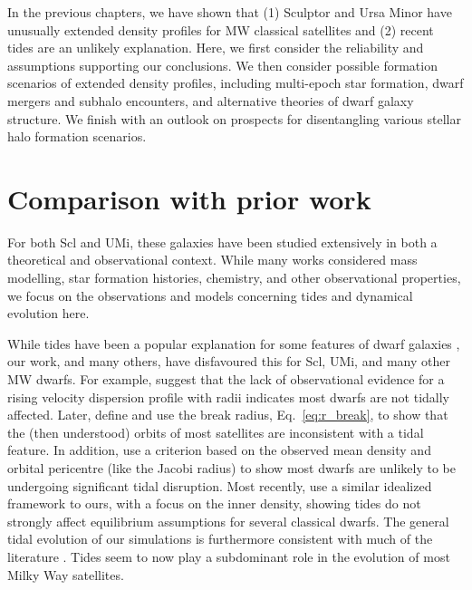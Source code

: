 In the previous chapters, we have shown that (1) Sculptor and Ursa Minor
have unusually extended density profiles for MW classical satellites and
(2) recent tides are an unlikely explanation. Here, we first consider
the reliability and assumptions supporting our conclusions. We then
consider possible formation scenarios of extended density profiles,
including multi-epoch star formation, dwarf mergers and subhalo
encounters, and alternative theories of dwarf galaxy structure. We
finish with an outlook on prospects for disentangling various stellar
halo formation scenarios.

\section{Comparison with prior work}\label{comparison-with-prior-work}

For both Scl and UMi, these galaxies have been studied extensively in
both a theoretical and observational context. While many works
considered mass modelling, star formation histories, chemistry, and
other observational properties, we focus on the observations and models
concerning tides and dynamical evolution here.

While tides have been a popular explanation for some features of dwarf
galaxies \citep[discussion above, and
e.g.,][]{tsujimoto+shigeyama2002, mayer+2001a}, our work, and many
others, have disfavoured this for Scl, UMi, and many other MW dwarfs.
For example, \citet{read+2006} suggest that the lack of observational
evidence for a rising velocity dispersion profile with radii indicates
most dwarfs are not tidally affected. Later, \citet{penarrubia+2009}
define and use the break radius, Eq.~\ref{eq:r_break}, to show that the
(then understood) orbits of most satellites are inconsistent with a
tidal feature. In addition, \citet{pace+erkal+li2022} use a criterion
based on the observed mean density and orbital pericentre (like the
Jacobi radius) to show most dwarfs are unlikely to be undergoing
significant tidal disruption. Most recently,
\citet{tchiorniy+genina2025} use a similar idealized framework to ours,
with a focus on the inner density, showing tides do not strongly affect
equilibrium assumptions for several classical dwarfs. The general tidal
evolution of our simulations is furthermore consistent with much of the
literature \citep[e.g.,][]{robles+bullock2021, EN2021}. Tides seem to
now play a subdominant role in the evolution of most Milky Way
satellites.

